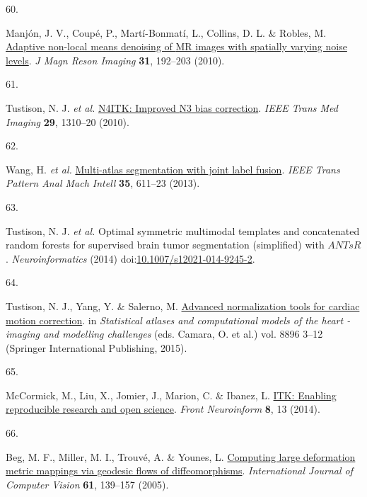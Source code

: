 \documentclass[
  12pt,
]{article}
\newlength{\cslhangindent}
\newlength{\csllabelwidth}
\newenvironment{CSLReferences}[2] %
 {\begin{list}{}{%
  \setlength{\itemindent}{0pt}
  \setlength{\leftmargin}{0pt}
  \setlength{\parsep}{0pt}
  \ifodd #1
   \setlength{\leftmargin}{\cslhangindent}
   \setlength{\itemindent}{-1\cslhangindent}
  \fi
  \setlength{\itemsep}{#2\baselineskip}}}
 {\end{list}}
\newcommand{\CSLLeftMargin}[1]{\parbox[t]{\csllabelwidth}{\strut#1\strut}}
\newcommand{\CSLRightInline}[1]{\parbox[t]{\linewidth - \csllabelwidth}{\strut#1\strut}}
\begin{document}
\begin{CSLReferences}{0}{0}
\CSLLeftMargin{60. }%
\CSLRightInline{Manjón, J. V., Coupé, P., Martí-Bonmatí, L., Collins, D.
L. \& Robles, M. \href{https://doi.org/10.1002/jmri.22003}{Adaptive
non-local means denoising of {MR} images with spatially varying noise
levels}. \emph{J Magn Reson Imaging} \textbf{31}, 192--203 (2010).}

\CSLLeftMargin{61. }%
\CSLRightInline{Tustison, N. J. \emph{et al.}
\href{https://doi.org/10.1109/TMI.2010.2046908}{{N4ITK}: Improved {N3}
bias correction}. \emph{IEEE Trans Med Imaging} \textbf{29}, 1310--20
(2010).}

\CSLLeftMargin{62. }%
\CSLRightInline{Wang, H. \emph{et al.}
\href{https://doi.org/10.1109/TPAMI.2012.143}{Multi-atlas segmentation
with joint label fusion}. \emph{IEEE Trans Pattern Anal Mach Intell}
\textbf{35}, 611--23 (2013).}

\CSLLeftMargin{63. }%
\CSLRightInline{Tustison, N. J. \emph{et al.} Optimal symmetric
multimodal templates and concatenated random forests for supervised
brain tumor segmentation (simplified) with {\(ANTsR\)}.
\emph{Neuroinformatics} (2014)
doi:\href{https://doi.org/10.1007/s12021-014-9245-2}{10.1007/s12021-014-9245-2}.}

\CSLLeftMargin{64. }%
\CSLRightInline{Tustison, N. J., Yang, Y. \& Salerno, M.
\href{https://doi.org/10.1007/978-3-319-14678-2_1}{Advanced
normalization tools for cardiac motion correction}. in \emph{Statistical
atlases and computational models of the heart - imaging and modelling
challenges} (eds. Camara, O. et al.) vol. 8896 3--12 (Springer
International Publishing, 2015).}

\CSLLeftMargin{65. }%
\CSLRightInline{McCormick, M., Liu, X., Jomier, J., Marion, C. \&
Ibanez, L. \href{https://doi.org/10.3389/fninf.2014.00013}{ITK: Enabling
reproducible research and open science}. \emph{Front Neuroinform}
\textbf{8}, 13 (2014).}

\CSLLeftMargin{66. }%
\CSLRightInline{Beg, M. F., Miller, M. I., Trouvé, A. \& Younes, L.
\href{https://doi.org/10.1023/B:VISI.0000043755.93987.aa}{Computing
large deformation metric mappings via geodesic flows of
diffeomorphisms}. \emph{International Journal of Computer Vision}
\textbf{61}, 139--157 (2005).}


\end{CSLReferences}
\end{document}
